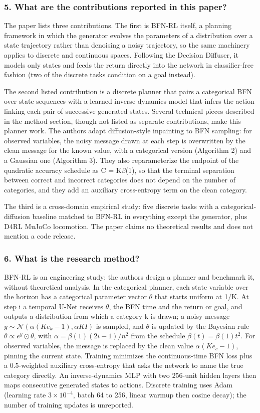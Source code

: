 \documentclass[11pt]{article}
\newcommand{\question}[1]{\subsubsection*{#1}}
\begin{document}
\question{5. What are the contributions reported in this paper?}

The paper lists three contributions. The first is BFN-RL itself, a planning framework in which the generator evolves the parameters of a distribution over a state trajectory rather than denoising a noisy trajectory, so the same machinery applies to discrete and continuous spaces. Following the Decision Diffuser, it models only states and feeds the return directly into the network in classifier-free fashion (two of the discrete tasks condition on a goal instead).

The second listed contribution is a discrete planner that pairs a categorical BFN over state sequences with a learned inverse-dynamics model that infers the action linking each pair of successive generated states. Several technical pieces described in the method section, though not listed as separate contributions, make this planner work. The authors adapt diffusion-style inpainting to BFN sampling: for observed variables, the noisy message drawn at each step is overwritten by the clean message for the known value, with a categorical version (Algorithm 2) and a Gaussian one (Algorithm 3). They also reparameterize the endpoint of the quadratic accuracy schedule as C = K\ensuremath{\beta}(1), so that the terminal separation between correct and incorrect categories does not depend on the number of categories, and they add an auxiliary cross-entropy term on the clean category.

The third is a cross-domain empirical study: five discrete tasks with a categorical-diffusion baseline matched to BFN-RL in everything except the generator, plus D4RL MuJoCo locomotion. The paper claims no theoretical results and does not mention a code release.

\question{6. What is the research method?}

BFN-RL is an engineering study: the authors design a planner and benchmark it, without theoretical analysis. In the categorical planner, each state variable over the horizon has a categorical parameter vector \ensuremath{\theta} that starts uniform at 1/K. At step i a temporal U-Net receives \ensuremath{\theta}, the BFN time and the return or goal, and outputs a distribution from which a category k is drawn; a noisy message $y \sim \mathcal{N}(\alpha(K e_k - 1), \alpha K I)$ is sampled, and \ensuremath{\theta} is updated by the Bayesian rule $\theta \propto e^{y} \odot \theta$, with $\alpha = \beta(1)(2i - 1)/n^2$ from the schedule $\beta(t) = \beta(1)t^2$. For observed variables, the message is replaced by the clean value $\alpha(K e_c - 1)$, pinning the current state. Training minimizes the continuous-time BFN loss plus a 0.5-weighted auxiliary cross-entropy that asks the network to name the true category directly. An inverse-dynamics MLP with two 256-unit hidden layers then maps consecutive generated states to actions. Discrete training uses Adam (learning rate $3\times10^{-4}$, batch 64 to 256, linear warmup then cosine decay); the number of training updates is unreported.
\end{document}
